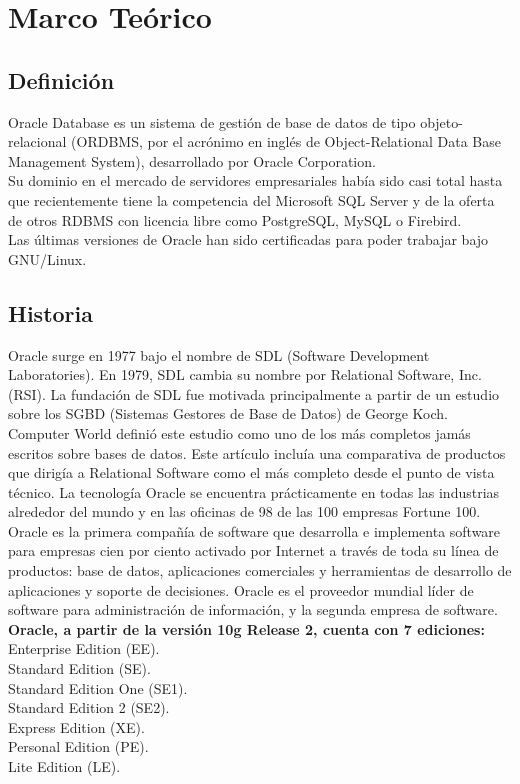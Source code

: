 \section{Marco Teórico}
\vspace{12pt}

\subsection{Definición}
Oracle Database es un sistema de gestión de base de datos de tipo objeto-relacional (ORDBMS, por el acrónimo en inglés de Object-Relational Data Base Management System), desarrollado por Oracle Corporation.\\
Su dominio en el mercado de servidores empresariales había sido casi total hasta que recientemente tiene la competencia del Microsoft SQL Server y de la oferta de otros RDBMS con licencia libre como PostgreSQL, MySQL o Firebird.\\
Las últimas versiones de Oracle han sido certificadas para poder trabajar bajo GNU/Linux.\\


\subsection{Historia}

Oracle surge en 1977 bajo el nombre de SDL (Software Development Laboratories).
En 1979, SDL cambia su nombre por Relational Software, Inc. (RSI).
La fundación de SDL fue motivada principalmente a partir de un estudio sobre los SGBD (Sistemas Gestores de Base de Datos) de George Koch. Computer World definió este estudio como uno de los más completos jamás escritos sobre bases de datos. Este artículo incluía una comparativa de productos que dirigía a Relational Software como el más completo desde el punto de vista técnico. 
La tecnología Oracle se encuentra prácticamente en todas las industrias alrededor del mundo y en las oficinas de 98 de las 100 empresas Fortune 100. Oracle es la primera compañía de software que desarrolla e implementa software para empresas cien por ciento activado por Internet a través de toda su línea de productos: base de datos, aplicaciones comerciales y herramientas de desarrollo de aplicaciones y soporte de decisiones. Oracle es el proveedor mundial líder de software para administración de información, y la segunda empresa de software.
\vspace{12pt}\\
\textbf {Oracle, a partir de la versión 10g Release 2, cuenta con 7 ediciones:}\\
Enterprise Edition (EE).\\
Standard Edition (SE).\\
Standard Edition One (SE1).\\
Standard Edition 2 (SE2).\\
Express Edition (XE).\\
Personal Edition (PE).\\
Lite Edition (LE).\\
\vspace{12pt}\\

